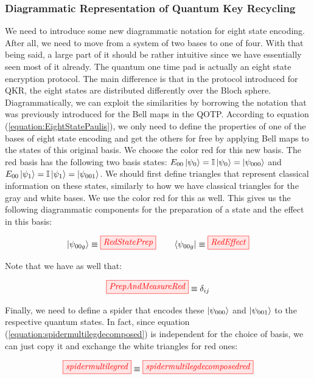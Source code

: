 \documentclass[]{article}
\begin{document}
\subsubsection{Diagrammatic Representation of Quantum Key Recycling}
We need to introduce some new diagrammatic notation for eight state encoding. After all, we need to move from a system of two bases to one of four. With that being said, a large part of it should be rather intuitive since we have essentially seen most of it already. The quantum one time pad is actually an eight state encryption protocol. The main difference is that in the protocol introduced for QKR, the eight states are distributed differently over the Bloch sphere. Diagrammatically, we can exploit the similarities by borrowing the notation that was previously introduced for the Bell maps in the QOTP. According to equation (\ref{equation:EightStatePaulis}), we only need to define the properties of one of the bases of eight state encoding and get the others for free by applying Bell maps to the states of this original basis. We choose the color red for this new basis. The red basis has the following two basis states: $E_{00}\ket{\psi_{0}} = \mathbb{I}\ket{\psi_{0}} = \ket{\psi_{000}}$ and $E_{00}\ket{\psi_{1}} = \mathbb{I}\ket{\psi_{1}} = \ket{\psi_{001}}$. We should first define triangles that represent classical information on these states, similarly to how we have classical triangles for the gray and white bases. We use the color red for this as well. This gives us the following diagrammatic components for the preparation of a state and the effect in this basis:

\begin{equation}
	\label{equation:newbases}
	\ket{\psi_{00g}} \equiv \tikzfig{RedStatePrep} ~~~~~~ \bra{\psi_{00g}} \equiv \tikzfig{RedEffect}
\end{equation}

Note that we have as well that:

\begin{equation}
\label{equation:RedMeasureAndEffect}
\tikzfig{PrepAndMeasureRed} \equiv \delta_{ij}
\end{equation}

Finally, we need to define a spider that encodes these $\ket{\psi_{000}}$ and $\ket{\psi_{001}}$ to the respective quantum states. In fact, since equation (\ref{equation:spidermultilegdecomposed}) is independent for the choice of basis, we can just copy it and exchange the white triangles for red ones:

\begin{equation}
	\label{equation:RedSpiderPrepareAndMeasure}
\tikzfig{spidermultilegred} \equiv \tikzfig{spidermultilegdecomposedred}
\end{equation}
\end{document}
